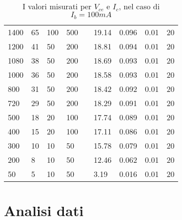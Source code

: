 \documentclass{article}
\begin{document}
\begin{table}[H]
\begin{tabular}{|l|l|l|l|l|l|l|l|l|}
        1400          & 65                        & 100                       & 500                        &  & 19.14      & 0.096                      & 0.01                       & 20                         \\ \cline{1-4} \cline{6-9}
        1200          & 41                        & 50                        & 200                        &  & 18.81      & 0.094                      & 0.01                       & 20                         \\ \cline{1-4} \cline{6-9}
        1080          & 38                        & 50                        & 200                        &  & 18.69      & 0.093                      & 0.01                       & 20                         \\ \cline{1-4} \cline{6-9}
        1000          & 36                        & 50                        & 200                        &  & 18.58      & 0.093                      & 0.01                       & 20                         \\ \cline{1-4} \cline{6-9}
        800           & 31                        & 50                        & 200                        &  & 18.42      & 0.092                      & 0.01                       & 20                         \\ \cline{1-4} \cline{6-9}
        720           & 29                        & 50                        & 200                        &  & 18.29      & 0.091                      & 0.01                       & 20                         \\ \cline{1-4} \cline{6-9}
        500           & 18                        & 20                        & 100                        &  & 17.74      & 0.089                      & 0.01                       & 20                         \\ \cline{1-4} \cline{6-9}
        400           & 15                        & 20                        & 100                        &  & 17.11      & 0.086                      & 0.01                       & 20                         \\ \cline{1-4} \cline{6-9}
        300           & 10                        & 10                        & 50                         &  & 15.78      & 0.079                      & 0.01                       & 20                         \\ \cline{1-4} \cline{6-9}
        200           & 8                         & 10                        & 50                         &  & 12.46      & 0.062                      & 0.01                       & 20                         \\ \cline{1-4} \cline{6-9}
        50            & 5                         & 10                        & 50                         &  & 3.19       & 0.016                      & 0.01                       & 20                         \\ \cline{1-4} \cline{6-9}
    \end{tabular}
    \caption{I valori misurati per $V_{ce}$ e $I_c$, nel caso di $I_b=100 mA$}\label{Tabella 2}
    \medskip
\end{table}

\section{Analisi dati}
\end{document}
